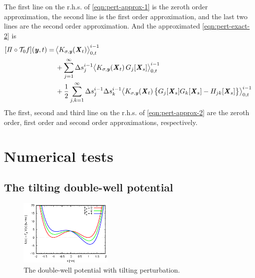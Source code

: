 \documentclass[aip,jcp,a4paper,reprint,onecolumn]{revtex4-1}
\newcommand{\vect}[1]{\textbf{\textit{#1}}}
\newcommand{\mt}{\mathcal T}
\newcommand{\proj}{\mathit\Pi}
\begin{document}
The first line on the r.h.s. of \eqref{eqn:pert-approx-1}
is the zeroth order approximation,  the second line is the
first order approximation, and the last two lines are the
second order approximation.
And the approximated \eqref{eqn:pert-exact-2} is
\begin{align}
  \nonumber
  [\proj\circ\mt_0 f](\vect y, t)
  =&\,
  \big\langle
  K_{\sigma,\vect y}(\vect X_t)
  \big\rangle_{0,t}^{i-1}
  \\ \nonumber
  &\,+
  \sum_{j=1}^\infty
  \Delta s_j^{i-1}
  \big\langle
  K_{\sigma,\vect y}(\vect X_t)\,
  G_j[\vect X_s]
  \big\rangle_{0,t}^{i-1}
  \\\label{eqn:pert-approx-2}
  &\,
  +
  \frac 12
  \sum_{j,k=1}^\infty
  \Delta s_j^{i-1}\Delta s_k^{i-1}
  \big\langle
  K_{\sigma,\vect y}(\vect X_t)\,
  \big\{
  G_j[\vect X_s] G_k[\vect X_s] -
  H_{jk}[\vect X_s]
  \big\}
  \big\rangle_{0,t}^{i-1}  
\end{align}
The first, second and third line on the r.h.s. of \eqref{eqn:pert-approx-2}
are the zeroth order, first order and second order approximations, respectively.









\section{Numerical tests}

\subsection{The tilting double-well potential}

\begin{figure}
  \centering
  \includegraphics[width=0.4\textwidth]{figs/fig-tilt-pot.eps}
  \caption{The double-well potential with tilting perturbation.}
  \label{fig:tmp1}
\end{figure}
\end{document}
